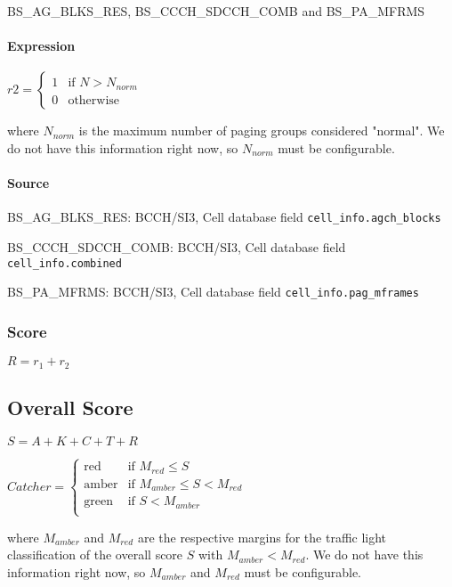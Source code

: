 \documentclass[a4paper,11pt,notitlepage,bigheadings,oneside]{scrartcl}
\begin{document}
BS\_AG\_BLKS\_RES, BS\_CCCH\_SDCCH\_COMB and BS\_PA\_MFRMS

\paragraph{Expression}

$r2 =
\begin{cases}
	1 & \text{if } N > N_{norm} \\
        0 & \text{otherwise}
        \end{cases}
$

where $N_{norm}$ is the maximum number of paging groups considered "normal". We
do not have this information right now, so $N_{norm}$ must be configurable.

\paragraph{Source}

BS\_AG\_BLKS\_RES: BCCH/SI3, Cell database field \verb|cell_info.agch_blocks|

BS\_CCCH\_SDCCH\_COMB: BCCH/SI3, Cell database field \verb|cell_info.combined|

BS\_PA\_MFRMS: BCCH/SI3, Cell database field \verb|cell_info.pag_mframes|

\subsubsection{Score}

$R = r_1 + r_2$

\subsection{Overall Score}

$S = A + K + C + T + R$

$Catcher =
\begin{cases}
	\text{red}   & \text{if } M_{red} \leq S \\
        \text{amber} & \text{if } M_{amber} \leq S < M_{red} \\
        \text{green} & \text{if } S < M_{amber} \\
\end{cases}
$

where $M_{amber}$ and $M_{red}$ are the respective margins for the traffic
light classification of the overall score $S$ with $M_{amber} < M_{red}$. We do
not have this information right now, so $M_{amber}$ and $M_{red}$ must be
configurable.



\end{document}
